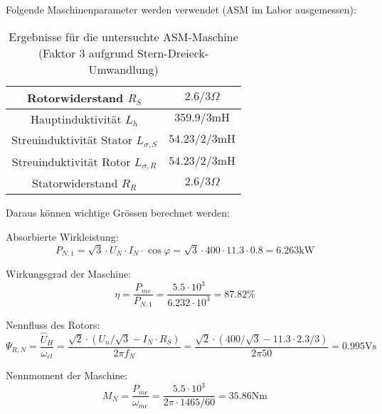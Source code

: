 Folgende Maschinenparameter werden verwendet (ASM im Labor ausgemessen):
\begin{table}[h]
	\centering
	\begin{tabular}{|c|c|}
		\hline 
		Rotorwiderstand $R_{S}$ & $\quad 2.6/3 \Omega \quad$ \\ \hline 
		Hauptinduktivität $L_{h}$ & $359.9/3 \mathrm{mH}$ \\ \hline
		Streuinduktivität Stator $L_{\sigma,S}$ & $54.23/2/3 \mathrm{mH}$ \\ \hline
		Streuinduktivität Rotor $L_{\sigma,R}$ & $54.23/2/3 \mathrm{mH}$ \\ \hline		
		Statorwiderstand $R_{R}$ & $2.6/3 \Omega$ \\ \hline 	
	\end{tabular} 	
	\caption{Ergebnisse für die untersuchte ASM-Maschine (Faktor 3 aufgrund Stern-Dreieck-Umwandlung)}
	\label{tab:Spezifikation_ASM}
\end{table}
\renewcommand{\arraystretch}{1}


Daraus können wichtige Grössen berechnet werden:

Absorbierte Wirkleistung:
\begin{equation}\label{equ:Absorbierte_Leitung}
P_{N,1} = \sqrt{3}\cdot U_{N}\cdot I_{N}\cdot \cos \varphi = \sqrt{3}\cdot 400\cdot 11.3\cdot 0.8 = 6.263\mathrm{kW}
\end{equation}

Wirkungsgrad der Maschine:
\begin{equation}\label{equ:Wirkungsgrad}
\eta = \frac{P_{me}}{P_{N,1}} = \frac{5.5\cdot 10^{3}}{6.232\cdot 10^{3}} = 87.82\%
\end{equation}

Nennfluss des Rotors:
\begin{equation}\label{equ:Nennfluss}
\Psi_{R,N} = \frac{\hat{U}_{H}}{\omega _{el}} = \frac{\sqrt{2}\cdot(U_n/\sqrt{3}-I_{N}\cdot R_{S})}{2\pi f_{N}} = \frac{\sqrt{2}\cdot(400/\sqrt{3}-11.3\cdot 2.3/3)}{2\pi 50} =  0.995 \mathrm{Vs}
\end{equation}

Nennmoment der Maschine:
\begin{equation}\label{equ:Nennmoment}
M_{N} = \frac{P_{me}}{\omega _{me}} = \frac{5.5\cdot 10^{3}}{2\pi\cdot 1465/60} = 35.86 \mathrm{Nm}
\end{equation}


